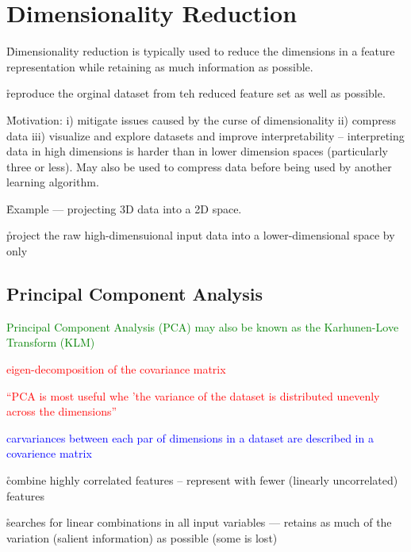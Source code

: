 \section{Dimensionality Reduction}

\r{Dimensionality reduction is typically used to reduce the dimensions in a feature representation while retaining as much information as possible.}

\r{reproduce the orginal dataset from teh reduced feature set as well as possible.}

\r{Motivation: i) mitigate issues caused by the curse of dimensionality ii) compress data iii) visualize and explore datasets and improve interpretability -- interpreting data in high dimensions is harder than in lower dimension spaces (particularly three or less). May also be used to compress data before being used by another learning algorithm.}

\r{Example --- projecting 3D data into a 2D space.}

\r{project the raw high-dimensuional input data into  a lower-dimensional space by only }


\subsection{Principal Component Analysis}

\textcolor{green}{{Principal Component Analysis (PCA)} may also be known as the {Karhunen-Love Transform (KLM)} }

\textcolor{red}{eigen-decomposition of the covariance matrix}

\textcolor{red}{``PCA is most useful whe 'the variance of the dataset is distributed unevenly across the dimensions'' }

\textcolor{blue}{carvariances between each par of dimensions in a dataset are described in a {covarience matrix} }

\r{combine highly correlated features -- represent with fewer (linearly uncorrelated) features}

\r{searches for linear combinations in all input variables --- retains as much of the variation (salient information) as possible (some is lost)}

